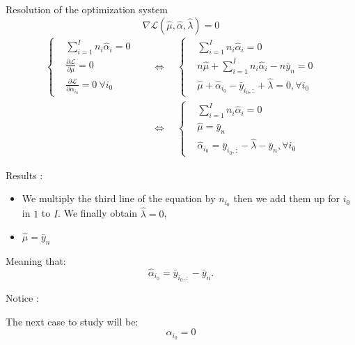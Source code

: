 \documentclass[unknownkeysallowed]{beamer}
\begin{document}
\begin{frame}{Resolution of the optimization system}
\[\nabla \mathcal{L}(\hat\mu,\hat\alpha,\hat\lambda)=0\]
\[
\begin{aligned}
\begin{cases}
&  \sum\limits_{i=1}^{I}n_i \hat{\alpha}_i=0 \\
&  \frac{\partial \mathcal{L}}{\partial \mu}=0 \\
&  \frac{\partial \mathcal{L}}{\partial \alpha_{i_0}}=0\ \forall i_0 
\end{cases}
\quad&\Longleftrightarrow\quad
\begin{cases}
&  \sum\limits_{i=1}^{I}n_i\hat{\alpha}_i=0 \\
&  n\hat{\mu}+ \sum\limits_{i=1}^I n_i\hat{\alpha}_i-n\bar{y}_n=0 \\
&  \hat{\mu}+\hat{\alpha}_{i_0}-\bar{y}_{i_0,:}+\hat{\lambda} = 0, \forall{i_0} 
\end{cases}\\
& \Longleftrightarrow\quad
\begin{cases}
& \sum\limits_{i=1}^{I}n_i \hat{\alpha}_i=0 \\
& \hat{\mu}=\bar{y}_n \\
& \hat{\alpha}_{i_0} = \bar{y}_{i_0,:}-\hat{\lambda}-\bar{y}_n, \forall i_0

\end{cases}
\end{aligned}
\]

\end{frame}


\begin{frame}

\begin{alertblock}{Results : }
    \begin{itemize}
        \item We multiply the third line of the equation by $n_{i_0}$ then we add them up for $i_0$ in $1$ to $I$. We finally obtain $\hat{\lambda}=0$, 
        \item $\hat{\mu}=\bar{y}_n$
    \end{itemize}
Meaning that:
\[\hat{\alpha}_{i_0}=\bar{y}_{i_0,:}- \bar{y}_{n}.\]
\end{alertblock}


\begin{alertblock}{Notice : }

The next case to study will be: $$ \alpha_{i_0}=0$$

\end{alertblock}

\end{frame}
\end{document}
